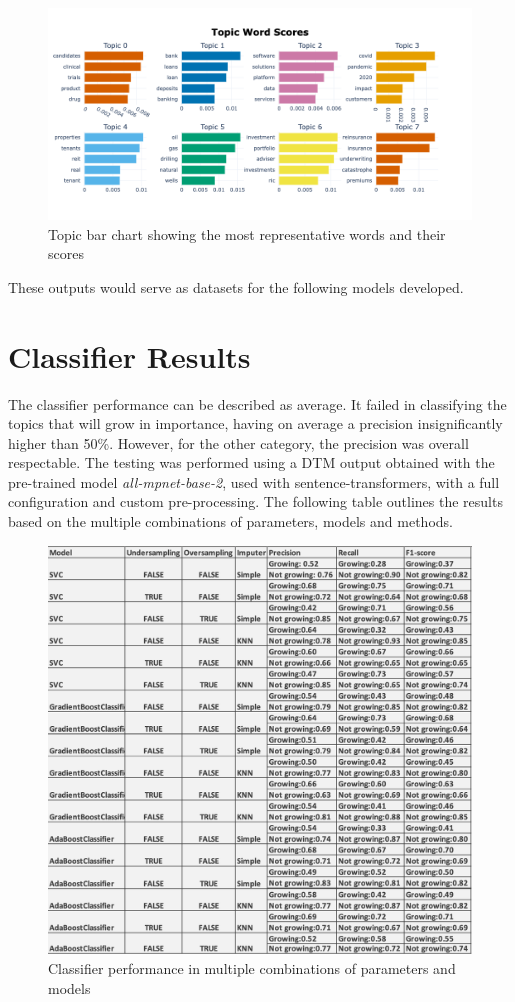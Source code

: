 \documentclass[12pt,MSc,a4paper,oneside]{muthesis}
\begin{document}
\begin{figure}[h]
    \centering
    \includegraphics[scale=0.5]{topic barchart flair 1-3.png}
    \caption{Topic bar chart showing the most representative words and their scores}
    \label{barchart}
\end{figure}

These outputs would serve as datasets for the following models developed.
\clearpage

\section{Classifier Results}
The classifier performance can be described as average. It failed in classifying the topics that will grow in importance, having on average a precision insignificantly higher than 50\%. However, for the other category, the precision was overall respectable. The testing was performed using a DTM output obtained with the pre-trained model \textit{all-mpnet-base-2}, used with sentence-transformers, with a full configuration and custom pre-processing. The following table outlines the results based on the multiple combinations of parameters, models and methods.

\begin{figure}[h]
    \centering
    \includegraphics[scale=0.5]{results/Classifier results.png}
    \caption{Classifier performance in multiple combinations of parameters and models}
\end{figure}
\end{document}
